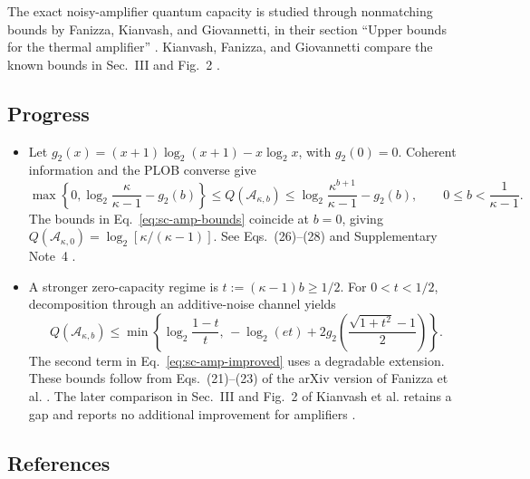 The exact noisy-amplifier quantum capacity is studied through nonmatching bounds by Fanizza, Kianvash, and Giovannetti, in their section ``Upper bounds for the thermal amplifier'' . Kianvash, Fanizza, and Giovannetti compare the known bounds in Sec.~III and Fig.~2 .

\subsection*{Progress}

\begin{itemize}
  \item Let $g_2(x)=(x+1)\log_2(x+1)-x\log_2x$, with $g_2(0)=0$. Coherent information and the PLOB converse give
\begin{equation}
 \max\left\{0,\log_2\frac\kappa{\kappa-1}-g_2(b)\right\}
 \leq Q(\mathcal A_{\kappa,b})
 \leq\log_2\frac{\kappa^{b+1}}{\kappa-1}-g_2(b),\qquad 0\leq b<\frac1{\kappa-1}.
 \label{eq:sc-amp-bounds}
\end{equation}
The bounds in Eq.~\eqref{eq:sc-amp-bounds} coincide at $b=0$, giving $Q(\mathcal A_{\kappa,0})=\log_2[\kappa/(\kappa-1)]$. See Eqs.~(26)--(28) and Supplementary Note~4 .

  \item A stronger zero-capacity regime is $t:=(\kappa-1)b\geq1/2$. For $0<t<1/2$, decomposition through an additive-noise channel yields
\begin{equation}
 Q(\mathcal A_{\kappa,b})\leq\min\left\{
 \log_2\frac{1-t}{t},\,
 -\log_2(et)+2g_2\!\left(\frac{\sqrt{1+t^2}-1}{2}\right)\right\}.
 \label{eq:sc-amp-improved}
\end{equation}
The second term in Eq.~\eqref{eq:sc-amp-improved} uses a degradable extension. These bounds follow from Eqs.~(21)--(23) of the arXiv version of Fanizza et al. . The later comparison in Sec.~III and Fig.~2 of Kianvash et al. retains a gap and reports no additional improvement for amplifiers .
\end{itemize}

\subsection*{References}

